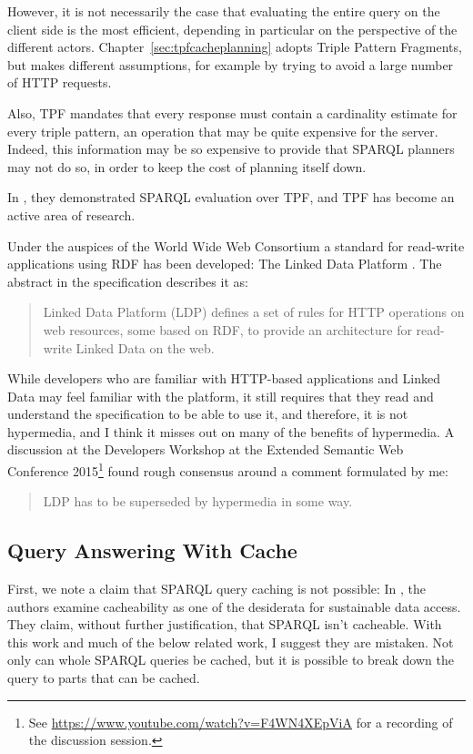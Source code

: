However, it is not necessarily the case that evaluating the entire
query on the client side is the most efficient, depending in
particular on the perspective of the different
actors. Chapter~\ref{sec:tpfcacheplanning} adopts Triple Pattern
Fragments, but makes different assumptions, for example by trying to avoid a
large number of HTTP requests. 

Also, TPF mandates that every response must contain a cardinality
estimate for every triple pattern, an operation that may be quite
expensive for the server.
Indeed, this information may be so expensive to provide that SPARQL
planners may not do so, in order to keep the cost of planning itself
down.

In \cite{verborgh2014querying}, they demonstrated SPARQL evaluation
over TPF, and TPF has become an active area of research.

Under the auspices of the  World Wide Web Consortium a standard for
read-write applications using RDF has been developed: The Linked Data
Platform \cite{ldp1}. The abstract in the specification describes it
as:
\begin{quote}
Linked Data Platform (LDP) defines a set of rules for HTTP operations
on web resources, some based on RDF, to provide an architecture for
read-write Linked Data on the web.
\end{quote}
While developers who are familiar with HTTP-based applications and
Linked Data may feel familiar with the platform, it still requires
that they read and understand the specification to be able to use it,
and therefore, it is not hypermedia, and I think it misses out on many
of the benefits of hypermedia. A discussion at the Developers Workshop
at the Extended Semantic Web Conference 2015\footnote{See
  \url{https://www.youtube.com/watch?v=F4WN4XEpViA} for a recording of
  the discussion session.} found rough consensus around a comment
formulated by me:
\begin{quote}
LDP has to be superseded by hypermedia in some way.
\end{quote}


\subsection{Query Answering With Cache}\label{sec:relcache}

First, we note a claim that SPARQL query caching is not possible:
In \cite{hogan2014paths}, the authors examine cacheability as one of the
desiderata for sustainable data access. They claim, without further
justification, that SPARQL isn't cacheable. With this work and much of
the below related work, I suggest they are mistaken. Not only can
whole SPARQL queries be cached, but it is possible to break down the
query to parts that can be cached.

